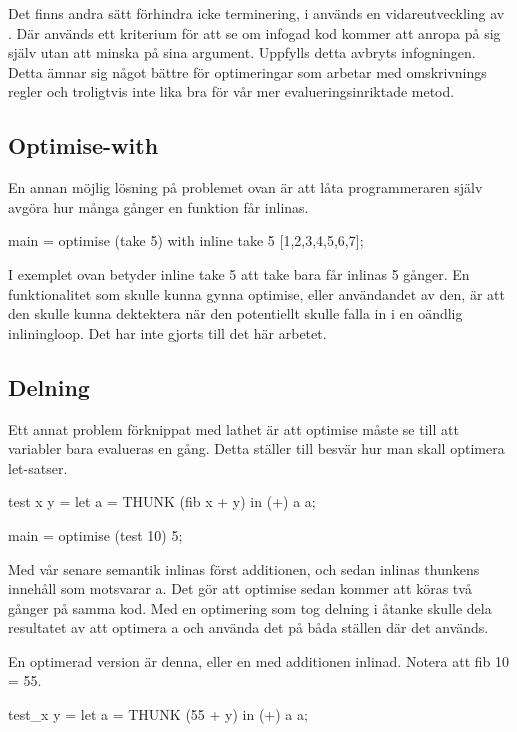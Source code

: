 \documentclass[Rapport]{subfiles}
\begin{document}
Det finns andra sätt förhindra icke terminering, i \cite{mitchell2007supercompiler} 
används en vidareutveckling av \cite{home-emb}. Där används ett kriterium för att se om infogad kod kommer att anropa på sig själv utan att minska på sina argument. Uppfylls detta avbryts infogningen. Detta ämnar sig något bättre för optimeringar som arbetar med omskrivnings regler och troligtvis inte lika bra för vår mer evalueringsinriktade metod.



\subsection{Optimise-with}
En annan möjlig lösning på problemet ovan är att låta programmeraren själv avgöra hur
många gånger en funktion får inlinas.

\begin{codeEx}
main = optimise (take 5) with { inline take 5 } [1,2,3,4,5,6,7];
\end{codeEx}

I exemplet ovan betyder inline take 5 att take bara får inlinas 5 gånger.
En funktionalitet som skulle kunna gynna optimise, eller användandet av den,
är att den skulle kunna dektektera när den potentiellt skulle falla in i en
oändlig inliningloop. Det har inte gjorts till det här arbetet.

\subsection{Delning}
Ett annat problem förknippat med lathet är att optimise måste se till att variabler bara 
evalueras en gång. Detta ställer till besvär hur man skall optimera let-satser.

\begin{codeEx}
test x y = let
    { a = THUNK (fib x + y)
    } in (+) a a;

main = optimise (test 10) 5;
\end{codeEx}

Med vår senare semantik inlinas först additionen, och sedan inlinas thunkens innehåll
som motsvarar a. Det gör att optimise sedan kommer att
köras två gånger på samma kod. Med en optimering som tog delning i åtanke 
skulle dela resultatet av att optimera a och använda det på båda ställen där det används.

En optimerad version är denna, eller en med additionen inlinad. Notera att fib 10 = 55.

\begin{codeEx}
test_x y = let
    { a = THUNK (55 + y)
    } in (+) a a;
\end{codeEx}
\end{document}
